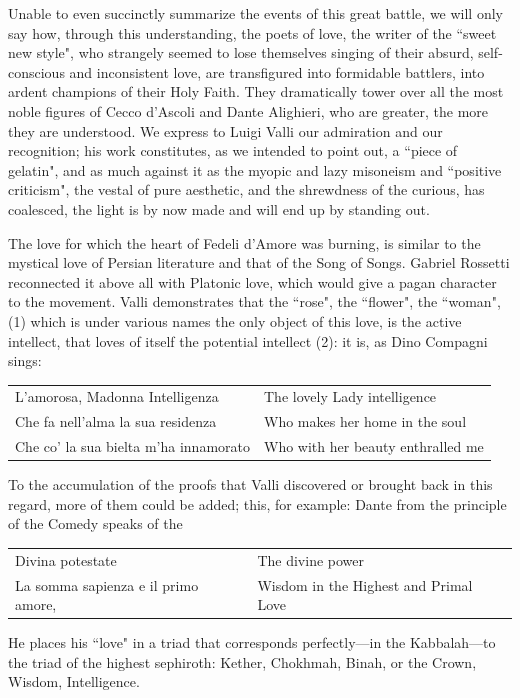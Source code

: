 Unable to even succinctly summarize the events of this great battle, we will only say how, through this understanding, the poets of love, the writer of the ``sweet new style", who strangely seemed to lose themselves singing of their absurd, self-conscious and inconsistent love, are transfigured into formidable battlers, into ardent champions of their Holy Faith. They dramatically tower over all the most noble figures of Cecco d'Ascoli and Dante Alighieri, who are greater, the more they are understood. We express to Luigi Valli our admiration and our recognition; his work constitutes, as we intended to point out, a ``piece of gelatin", and as much against it as the myopic and lazy misoneism and ``positive criticism", the vestal of pure aesthetic, and the shrewdness of the curious, has coalesced, the light is by now made and will end up by standing out.

The love for which the heart of Fedeli d'Amore was burning, is similar to the mystical love of Persian literature and that of the Song of Songs. Gabriel Rossetti reconnected it above all with Platonic love, which would give a pagan character to the movement. Valli demonstrates that the ``rose", the ``flower", the ``woman", (1) which is under various names the only object of this love, is the active intellect, that loves of itself the potential intellect (2): it is, as Dino Compagni sings:

\begin{table}[h]\footnotesize
\begin{tabularx}{\textwidth}{XX}
L'amorosa, Madonna Intelligenza &
The lovely Lady intelligence\\
Che fa nell'alma la sua residenza &
Who makes her home in the soul\\
Che co' la sua bielta m'ha innamorato &
Who with her beauty enthralled me
\end{tabularx}
\end{table}
To the accumulation of the proofs that Valli discovered or brought back in this regard, more of them could be added; this, for example: Dante from the principle of the Comedy speaks of the

\begin{table}[h]\footnotesize
\begin{tabularx}{\textwidth}{XX}
Divina potestate &
The divine power\\
La somma sapienza e il primo amore, &
Wisdom in the Highest and Primal Love
\end{tabularx}
\end{table}
He places his ``love" in a triad that corresponds perfectly—in the Kabbalah—to the triad of the highest sephiroth: Kether, Chokhmah, Binah, or the Crown, Wisdom, Intelligence.

